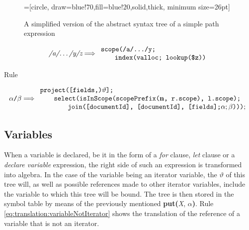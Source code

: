 \begin{figure}[h]
\centering
{}=[circle, draw=blue!70,fill=blue!20,solid,thick, minimum
size=26pt]
\label{fig:translation:pathAST}
\caption[AST of path expression]{A simplified version of the abstract syntax
tree of a simple path expression}
\end{figure}


\begin{equation}
\centering
\textit{/a/\ldots/y/z}
\Longrightarrow
\begin{array}{l}
	\mbox{\texttt{scope(/a/\ldots/y;}} \\
	\qquad \mbox{\texttt{index(valloc; lookup(\$z))}}
\end{array}
\label{eq:translation:pathExpr}
\end{equation}

Rule

\begin{equation}
\centering
\alpha \texttt{/} \beta
\Longrightarrow
\begin{array}{l}
	\mbox{\texttt{project([fields,)}} \vartheta \mbox{\texttt{];}} \\ \qquad
 	\mbox{\texttt{select(isInScope(scopePrefix(}\textbf{n}\texttt{, r.scope),
 	l.scope);}} \\ \qquad \qquad
 	\mbox{\texttt{join([documentId], [documentId], [fields];}} \alpha ; \beta
 	\mbox{\texttt{)))}};
\end{array}
\label{eq:translation:singleStep}
\end{equation}

\subsection{Variables}
\label{sect:translation:variables}
When a variable is declared, be it in the form of a \textit{for} clause,
\textit{let} clause or a \textit{declare variable} expression, the right side
of such an expression is transformed into algebra. In the case of the
variable being an iterator variable, the $\vartheta$ of this tree will, as well
as possible references made to other iterator variables, include the variable
to which this tree will be bound. The tree is then stored in the symbol
table by means of the previously mentioned \textbf{put(}\textit{X},
$\alpha$\textbf{)}. Rule \ref{eq:translation:variableNotIterator} shows the
translation of the reference of a variable that is not an iterator.

